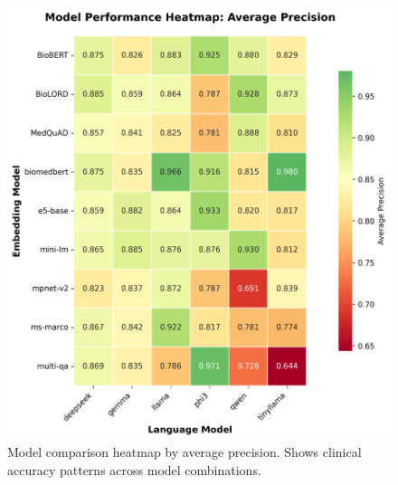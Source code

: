\begin{figure}[!htbp]
  \centering
  \includegraphics[width=\textwidth]{chap4_results/images/heatmap_precision.png}
  \caption{Model comparison heatmap by average precision. Shows clinical accuracy patterns across model combinations.}
  \label{fig:heatmap_precision}
\end{figure}

